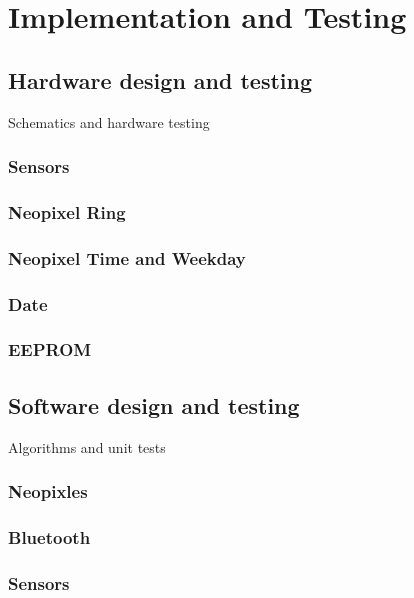 \chapter{Implementation and Testing}

\section{Hardware design and testing}
Schematics and hardware testing
\subsection{Sensors}
\subsection{Neopixel Ring}
\subsection{Neopixel Time and Weekday} 
\subsection{Date}
\subsection{EEPROM}


\section{Software design and testing}
Algorithms and unit tests
\subsection{Neopixles}
\subsection{Bluetooth}
\subsection{Sensors} 
